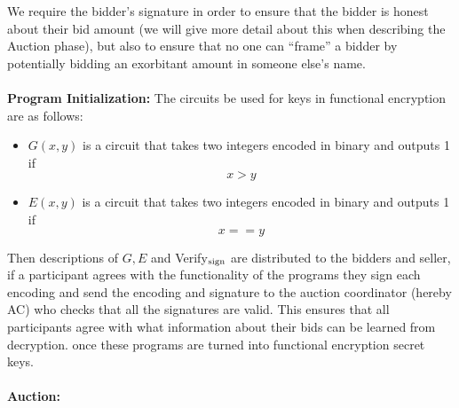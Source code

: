 \documentclass[12pt,twoside]{reedthesis}
\begin{document}
     \par We require the bidder's signature in order to ensure that the bidder is honest about their bid amount (we will give more detail about this when describing the Auction phase), but also to ensure that no one can ``frame'' a bidder by potentially bidding an exorbitant amount in someone else's name.
%
%
%
    \\ \\ \textbf{Program Initialization:} The circuits be used for keys in functional encryption are as follows:
    \begin{itemize}
    \item $G(x,y)$ is a circuit that takes two integers encoded in binary and outputs  1 if $$x>y$$
    \item $E(x,y)$ is a circuit that takes two integers encoded in binary and outputs 1 if $$
    x==y$$
    \end{itemize}
    Then descriptions of $G,E$ and Verify$_\text{sign}$ are distributed to the bidders and seller, if a participant agrees with the functionality of the programs they sign each encoding and send the encoding and signature to the auction coordinator (hereby AC) who checks that all the signatures are valid. This ensures that all participants agree with what information about their bids can be learned from decryption. once these programs are turned into functional encryption secret keys. \\
    \\
       \textbf{Auction:} 
       
\end{document}
